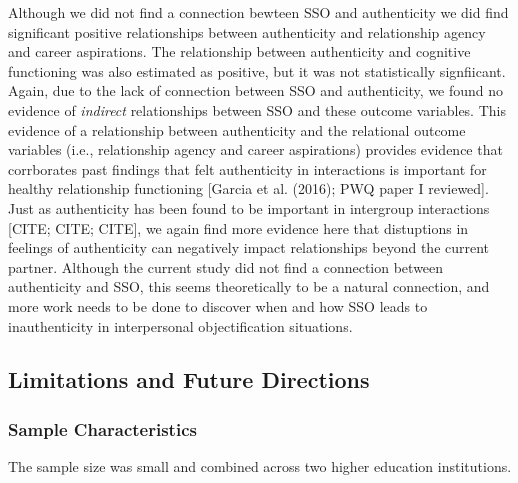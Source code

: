 \documentclass[
  man]{apa6}
\begin{document}
Although we did not find a connection bewteen SSO and authenticity we
did find significant positive relationships between authenticity and
relationship agency and career aspirations. The relationship between
authenticity and cognitive functioning was also estimated as positive,
but it was not statistically signfiicant. Again, due to the lack of
connection between SSO and authenticity, we found no evidence of
\emph{indirect} relationships between SSO and these outcome variables.
This evidence of a relationship between authenticity and the relational
outcome variables (i.e., relationship agency and career aspirations)
provides evidence that corrborates past findings that felt authenticity
in interactions is important for healthy relationship functioning
{[}Garcia et al. (2016); PWQ paper I reviewed{]}. Just as authenticity
has been found to be important in intergroup interactions {[}CITE; CITE;
CITE{]}, we again find more evidence here that distuptions in feelings
of authenticity can negatively impact relationships beyond the current
partner. Although the current study did not find a connection between
authenticity and SSO, this seems theoretically to be a natural
connection, and more work needs to be done to discover when and how SSO
leads to inauthenticity in interpersonal objectification situations.

\subsection{Limitations and Future
Directions}\label{limitations-and-future-directions}

\subsubsection{Sample Characteristics}\label{sample-characteristics}

The sample size was small and combined across two higher education
institutions.
\end{document}
